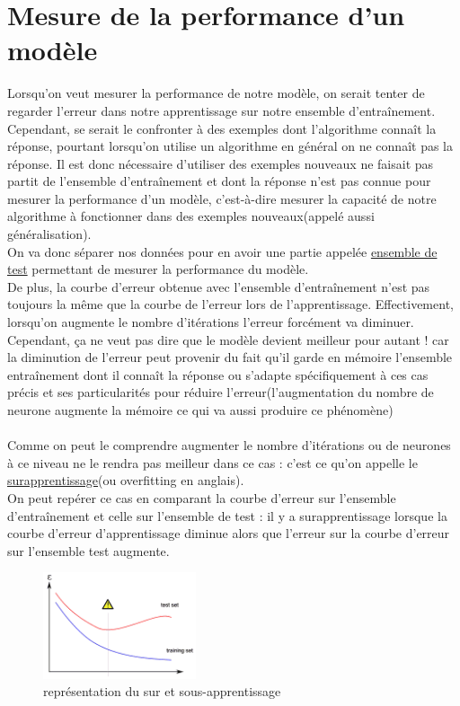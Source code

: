 \documentclass[openany,14pt,fleqn]{book} %
\begin{document}
\section{Mesure de la performance d'un modèle}
Lorsqu'on veut mesurer la performance de notre modèle, on serait tenter de regarder l'erreur dans notre apprentissage sur notre ensemble d'entraînement. Cependant, se serait le confronter à des exemples dont l'algorithme connaît la réponse, pourtant lorsqu'on utilise un algorithme en général on ne connaît pas la réponse. Il est donc nécessaire d'utiliser des exemples nouveaux ne faisait pas partit de l'ensemble d'entraînement et dont la réponse n'est pas connue pour mesurer la performance d'un modèle, c'est-à-dire mesurer la capacité de notre algorithme à fonctionner dans des exemples nouveaux(appelé aussi généralisation).\cite{Deep,Hugo_Larochelle14}\\
On va donc séparer nos données pour en avoir une partie appelée \underline{ensemble de test} permettant de mesurer la performance du modèle.\\
De plus, la courbe d'erreur obtenue avec l'ensemble d'entraînement n'est pas toujours la même que la courbe de l'erreur lors de l'apprentissage. Effectivement, lorsqu'on augmente le nombre d'itérations l'erreur forcément va diminuer. Cependant, ça ne veut pas dire que le modèle devient meilleur pour autant ! car la diminution de l'erreur peut provenir du fait qu'il garde en mémoire l'ensemble entraînement dont il connaît la réponse ou s’adapte spécifiquement à ces cas précis et ses particularités pour réduire l'erreur(l'augmentation du nombre de neurone augmente la mémoire ce qui va aussi produire ce phénomène)\\ \\ Comme on peut le comprendre augmenter le nombre d'itérations ou de neurones à ce niveau ne le rendra pas meilleur dans ce cas : c'est ce qu'on appelle le \underline{surapprentissage}(ou overfitting en anglais).\\  
On peut repérer ce cas en comparant la courbe d'erreur sur l'ensemble d'entraînement et celle sur l'ensemble de test : il y a surapprentissage lorsque la courbe d'erreur d'apprentissage diminue alors que l'erreur sur la courbe d'erreur sur l'ensemble test augmente.\\
\begin{figure}[h]
\centering\includegraphics[width=0.4\textwidth]{Pictures/overfitting.png}
\caption{représentation du sur et sous-apprentissage}
\end{figure}
\end{document}
